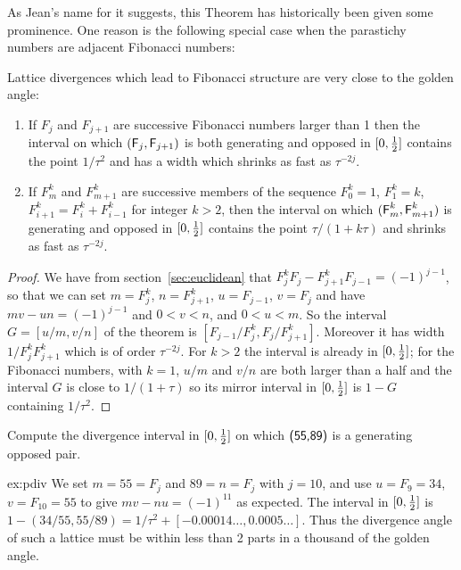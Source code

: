 %
As Jean's name for it suggests, this Theorem has historically been given some prominence. One reason is the following special case when the parastichy numbers are adjacent Fibonacci numbers:
\begin{theorem}
	Lattice divergences which lead to Fibonacci structure are very close to the golden angle:
	\begin{enumerate}
\item
	If $F_j$ and $F_{j+1}$ are successive Fibonacci numbers larger than 1 then the interval on which $({\textsf F}_j,{\textsf F}_{j+1})$ is both generating and opposed in $[0,\textstyle{\frac{1}{2}}]$  contains the point $1/\tau^2$ and has a width 
	 which shrinks as fast as $\tau^{-2j}$.
\item 
If $F^k_m$ and $F^k_{m+1}$ are successive members of the sequence $F^k_0=1$, $F^k_1=k$, $F^k_{i+1}=F^k_i+F^k_{i-1}$ for integer $k>2$, then 
	the interval on which $({\textsf F}^k_m,{\textsf F}^k_{m+1})$ is generating and opposed in  $[0,\textstyle{\frac{1}{2}}]$ contains the point $\tau/(1+k\tau)$ and shrinks as fast as  $\tau^{-2j}$.
\end{enumerate}
\end{theorem}
\begin{proof}
	We have from section~\ref{sec:euclidean} that $F^{k}_j F_j-F^{k}_{j+1}F_{j-1}=(-1)^{j-1}$, so that we can set $m=F^{k}_j$, $n=F^{k}_{j+1}$, $u=F_{j-1}$, $v=F_{j}$ and have $mv-un=(-1)^{j-1}$ and $0<v<n$, and $0<u<m$. 
	So the interval $G=[u/m,v/n]$ of the theorem is $[F_{j-1}/F^k_{j},F_j/F^k_{j+1}]$.
	Moreover it has width $1/F^k_jF^{k}_{j+1}$ which is of order $\tau^{-2j}$.
	For $k>2$ the interval is already in $[0,\textstyle{\frac{1}{2}}]$; for the Fibonacci numbers, with $k=1$, $u/m$ and $v/n$ are both larger than a half and the interval $G$ is close to $1/(1+\tau)$ so its mirror 
	 interval in $[0,\textstyle{\frac{1}{2}}]$ is  
	$1-G$ containing $1/\tau^2$. 
\end{proof}
\begin{jExercise}\label{ex:pdiv}
	Compute the divergence interval in $[0,\textstyle{\frac{1}{2}}]$ on which  $\textsf{(55,89)}$ is a generating opposed pair.
\end{jExercise}
\begin{jAnswer}{ex:pdiv}
	We set $m=55=F_j$ and $89=n=F_j$ with $j=10$, and use $u=F_9=34$, $v=F_{10}=55$ to give $mv-nu=(-1)^{11}$ as expected.
	The interval in $[0,\textstyle{\frac{1}{2}}]$ is $1-(34/55,55/89)= 1/\tau^2+ [-0.00014\ldots, 0.0005\ldots]$.
	Thus the divergence angle of such a lattice must be within less than 2 parts in a thousand of the golden angle. 
\end{jAnswer}


